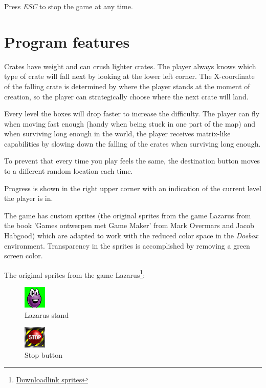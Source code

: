 \documentclass[]{article}
\begin{document}
Press \emph{ESC} to stop the game at any time.

\section{Program features}
Crates have weight and can crush lighter crates. The player always knows
which type of crate will fall next by looking at the lower left corner. 
The X-coordinate of the falling crate is determined by where the player 
stands at the moment of creation, so the player can strategically 
choose where the next crate will land.

Every level the boxes will drop faster to increase the difficulty.
The player can fly when moving fast enough (handy when being stuck
in one part of the map) and when surviving long enough in the world,
the player receives matrix-like capabilities by slowing down the falling of the
crates when surviving long enough.

To prevent that every time you play feels the same, the destination button
moves to a different random location each time.

Progress is shown in the right upper corner with an indication of the
current level the player is in.

The game has custom sprites (the original sprites from the game Lazarus
from the book 'Games ontwerpen met Game Maker' from Mark Overmars and Jacob
Habgood) which are adapted to work with the reduced color space in the
\emph{Dosbox} environment. Transparency in the sprites is accomplished by
removing a green screen color.

The original sprites from the game Lazarus\footnote{\href{https://www.vanduurenmedia.nl/EAN/9789059402843/Leer_jezelf_MAKKELIJK_Games_ontwerpen_met_Game_Maker}{Downloadlink sprites}}:
\begin{figure}[htpb]
    \centering
    \includegraphics[width=0.2\linewidth]{../sprites/Lazarus_stand.png}
    \caption{Lazarus stand}%
\end{figure}

\begin{figure}[htpb]
    \centering
    \includegraphics[width=0.2\linewidth]{../sprites/Button.png}
    \caption{Stop button}%
\end{figure}
\end{document}

